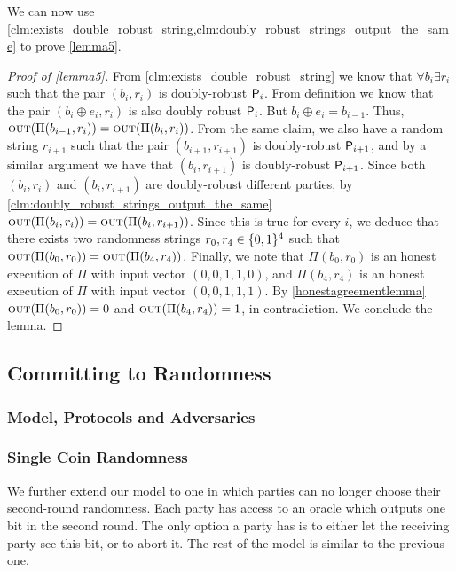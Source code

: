 We can now use \cref{clm:exists_double_robust_string,clm:doubly_robust_strings_output_the_same} to prove \cref{lemma5}.
\begin{proof}[Proof of \cref{lemma5}]
From \cref{clm:exists_double_robust_string} we know that $\forall b_i \exists r_i$ such that the pair $(b_i,r_i)$ is doubly-robust \wrt $\mathsf{P}_i$. From definition we know that the pair $(b_i \oplus e_i, r_i)$ is also doubly robust \wrt $\mathsf{P}_i$. But $b_i \oplus e_i = b_{i-1}$. Thus, $\textsc{out}(\Pi(b_{i-1},r_i)) = \textsc{out}(\Pi(b_i,r_i))$. From the same claim, we also have a random string $r_{i+1}$ such that the pair $(b_{i+1},r_{i+1})$ is doubly-robust \wrt $\mathsf{P}_{i+1}$, and by a similar argument we have that $(b_i,r_{i+1})$ is doubly-robust \wrt $\mathsf{P}_{i+1}$. Since both $(b_i,r_i)$ and $(b_i, r_{i+1})$ are doubly-robust \wrt different parties, by \cref{clm:doubly_robust_strings_output_the_same} $\textsc{out}(\Pi(b_i,r_i)) = \textsc{out}(\Pi(b_i,r_{i+1}))$. Since this is true for every $i$, we deduce that there exists two randomness strings $r_0,r_4 \in \{0,1\}^4$ such that $\textsc{out}(\Pi(b_0,r_0)) = \textsc{out}(\Pi(b_4,r_4))$. Finally, we note that $\Pi(b_0,r_0)$ is an honest execution of $\Pi$ with input vector $(0,0,1,1,0)$, and $\Pi(b_4,r_4)$ is an honest execution of $\Pi$ with input vector $(0,0,1,1,1)$. By \cref{honestagreementlemma} $\textsc{out}(\Pi(b_0,r_0)) = 0$ and $\textsc{out}(\Pi(b_4,r_4)) = 1$, in contradiction. We conclude the lemma.
\end{proof}

\subsection{Committing to Randomness}

\subsubsection{Model, Protocols and Adversaries}

\subsubsection{Single Coin Randomness}
We further extend our model to one in which parties can no longer choose their second-round randomness. Each party has access to an oracle which outputs one bit in the second round. The only option a party has is to either let the receiving party see this bit, or to abort it. The rest of the model is similar to the previous one.

